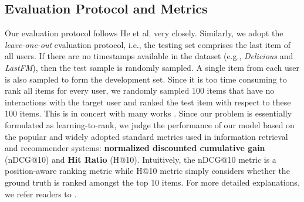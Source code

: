 \documentclass[sigconf]{acmart}
\begin{document}
\subsection{Evaluation Protocol and Metrics}
Our evaluation protocol follows He et al. \cite{He:2017:NCF:3038912.3052569} very closely. Similarly, we adopt the \textit{leave-one-out} evaluation protocol, i.e., the testing set comprises the last item of all users. If there are no timestamps available in the dataset (e.g., \textit{Delicious} and \textit{LastFM}), then the test sample is randomly sampled. A single item from each user is also sampled to form the development set. Since it is too time consuming to rank all items for every user, we randomly sampled $100$ items that have no interactions with the target user and ranked the test item with respect to these $100$ items. This is in concert with many works  \cite{DBLP:conf/www/BayerHKR17,DBLP:conf/sigir/HeZKC16,DBLP:conf/uai/RendleFGS09,He:2017:NCF:3038912.3052569}. Since our problem is essentially formulated as learning-to-rank, we judge the performance of our model based on the popular and widely adopted standard metrics used in information retrieval and recommender systems: \textbf{normalized discounted cumulative gain} (nDCG@10) \cite{DBLP:journals/tois/JarvelinK02} and \textbf{Hit Ratio} (H@10). Intuitively, the nDCG@10 metric is a position-aware ranking metric while H@10 metric simply considers whether the ground truth is ranked amongst the top 10 items. For more detailed explanations, we refer readers to \cite{He:2017:NCF:3038912.3052569}.
\end{document}
